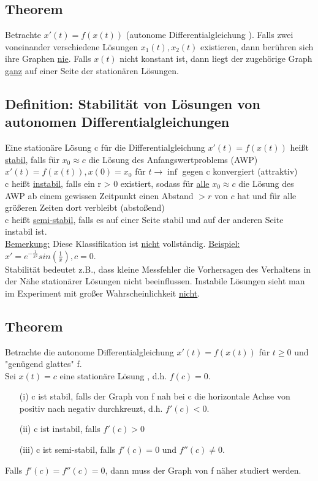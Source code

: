 \documentclass[12pt,a4paper]{article}
\newcommand{\DGL}{Differentialgleichung }
\newcommand{\DGLs}{Differentialgleichungen }
\newcommand{\Lsg}{Lösung }
\newcommand{\LSG}{Lösungen }
\begin{document}
\subsection{Theorem}
Betrachte $x'(t) = f(x(t))$ (autonome \DGL). Falls zwei voneinander verschiedene Lösungen $x_1(t), x_2(t)$ existieren, dann berühren sich ihre Graphen \underline{nie}. Falls $x(t)$ nicht konstant ist, dann liegt der zugehörige Graph \underline{ganz} auf einer Seite der stationären Lösungen.
\subsection{Definition: Stabilität von \LSG von autonomen \DGLs}
Eine stationäre \Lsg c für die \DGL $x'(t) = f(x(t))$ heißt \underline{stabil}, falls für $x_0 \approx c$ die \Lsg des Anfangswertproblems (AWP) $x'(t) = f(x(t)), x(0) = x_0$ für $t \rightarrow \inf$ gegen c konvergiert (attraktiv) \\
c heißt \underline{instabil}, falls ein r > 0 existiert, sodass für \underline{alle} $x_0 \approx c$ die \Lsg des AWP ab einem gewissen Zeitpunkt einen Abstand $>r$ von $c$ hat und für alle größeren Zeiten dort verbleibt (abstoßend) \\
c heißt \underline{semi-stabil}, falls es auf einer Seite stabil und auf der anderen Seite instabil ist. \\
\underline{Bemerkung:} Diese Klassifikation ist \underline{nicht} vollständig. \underline{Beispiel:} $x'=e^{-\frac{1}{x^2}}sin(\frac{1}{x}), c=0$. \\
Stabilität bedeutet z.B., dass kleine Messfehler die Vorhersagen des Verhaltens in der Nähe stationärer \LSG nicht beeinflussen. Instabile \LSG sieht man im Experiment mit großer Wahrscheinlichkeit \underline{nicht}.
\subsection{Theorem}
Betrachte die autonome \DGL $x'(t) = f(x(t))$ für $t \geq 0$ und "genügend glattes" f. \\
Sei $x(t) = c$ eine stationäre \Lsg, d.h. $f(c)=0$.
\begin{itemize}
\item[(i)] c ist stabil, falls der Graph von f nah bei c die horizontale Achse von positiv nach negativ durchkreuzt, d.h. $f'(c) < 0$.
\item[(ii)] c ist instabil, falls $f'(c) > 0$
\item[(iii)] c ist semi-stabil, falls $f'(c) = 0$ und $f''(c) \neq 0$.
\end{itemize}
Falls $f'(c) = f''(c) = 0$, dann muss der Graph von f näher studiert werden.
\end{document}
